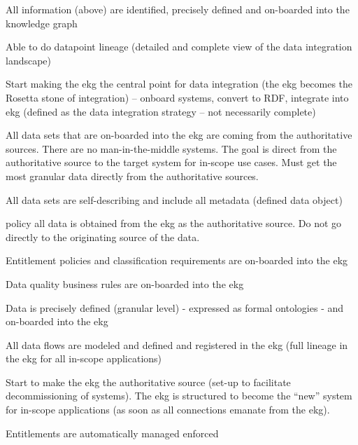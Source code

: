 \begin{scoring}

    \item All information (above) are identified, precisely defined and on-boarded into the knowledge graph
    \item Able to do datapoint lineage (detailed and complete view of the data integration landscape)
    \item Start making the \gls{ekg} the central point for data integration (the \gls{ekg} becomes the Rosetta stone of
          integration) -- onboard systems, convert to RDF, integrate into \gls{ekg} (defined as the
          data integration strategy -- not necessarily complete)
    \item All data sets that are on-boarded into the \gls{ekg} are coming from the authoritative sources.
          There are no man-in-the-middle systems.
          The goal is direct from the authoritative source to the target system for in-scope use cases.
          Must get the most granular data directly from the authoritative sources.
    \item All data sets are self-describing and include all metadata (defined data object)
    \item [policy] all data is obtained from the \gls{ekg} as the authoritative source.
          Do not go directly to the originating source of the data.
    \item Entitlement policies and classification requirements are on-boarded into the \gls{ekg}
    \item Data quality business rules are on-boarded into the \gls{ekg}

\end{scoring}

\kgmmscoringlevelThree

\begin{scoring}

    \item Data is precisely defined (granular level) - expressed as formal ontologies - and on-boarded into the \gls{ekg}
    \item All data flows are modeled and defined and registered in the \gls{ekg} (full lineage in the \gls{ekg} for all
          in-scope applications)
    \item Start to make the \gls{ekg} the authoritative source (set-up to facilitate decommissioning of systems).
          The \gls{ekg} is structured to become the “new” system for in-scope applications (as soon as all
          connections emanate from the \gls{ekg}).
    \item Entitlements are automatically managed enforced

\end{scoring}


